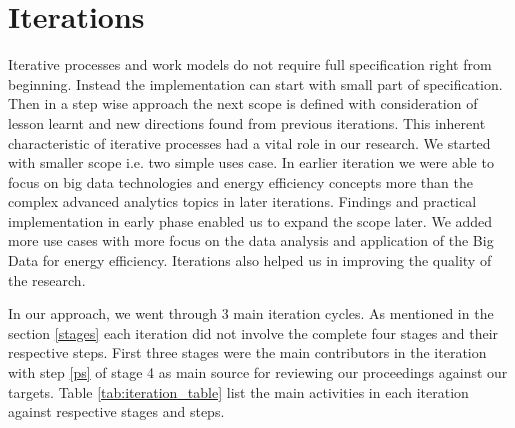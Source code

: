 \section{Iterations} \label{iteration}
Iterative processes and work models do not require full specification right from beginning. Instead the implementation can start with small part of specification. Then in a step wise approach the next scope is defined with consideration of lesson learnt and new directions found from previous iterations. This inherent characteristic of iterative processes had a vital role in our research. We started with smaller scope i.e. two simple uses case. In earlier iteration we were able to focus on big data technologies and energy efficiency concepts more than the complex advanced analytics topics in later iterations. Findings and practical implementation in early phase enabled us to expand the scope later. We added more use cases with more focus on the data analysis and application of the Big Data for energy efficiency. Iterations also helped us in improving the quality of the research. 

In our approach, we went through 3 main iteration cycles. As mentioned in the section \ref{stages} each iteration did not involve the complete four stages and their respective steps. First three stages were the main contributors in the iteration with step \ref{ps} of stage 4 as main source for reviewing our proceedings against our targets. Table \ref{tab:iteration_table} list the main activities in each iteration against respective stages and steps.    

